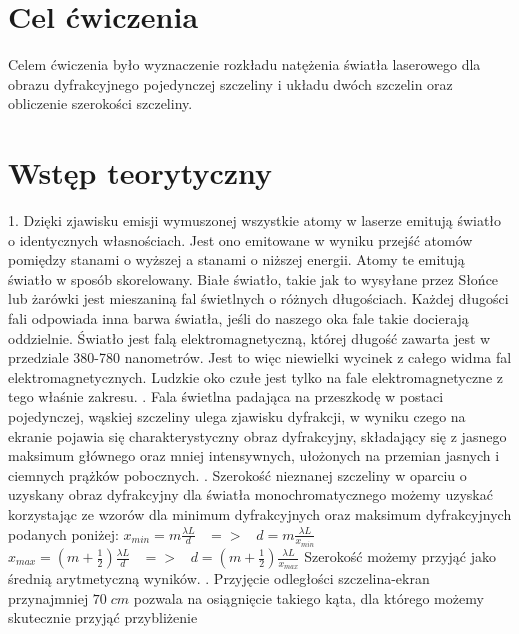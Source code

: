 \documentclass[12pt]{article}
\begin{document}
\tableofcontents \newpage
\section{Cel ćwiczenia}
Celem ćwiczenia było wyznaczenie rozkładu natężenia światła laserowego dla obrazu dyfrakcyjnego pojedynczej szczeliny i układu dwóch szczelin oraz obliczenie szerokości szczeliny.
\section{Wstęp teorytyczny}
1. Dzięki zjawisku emisji wymuszonej wszystkie atomy w laserze emitują światło o identycznych własnościach. Jest ono emitowane w wyniku przejść atomów pomiędzy stanami o wyższej a stanami o niższej energii. Atomy te emitują światło w sposób skorelowany. 
Białe światło, takie jak to wysyłane przez Słońce lub żarówki jest mieszaniną fal świetlnych o różnych długościach. Każdej długości fali odpowiada inna barwa światła, jeśli do naszego oka fale takie docierają oddzielnie. Światło jest falą elektromagnetyczną, której długość zawarta jest w przedziale 380-780 nanometrów. Jest to więc niewielki wycinek z całego widma fal elektromagnetycznych. Ludzkie oko czułe jest tylko na fale elektromagnetyczne z tego właśnie zakresu. . Fala świetlna padająca na przeszkodę w postaci pojedynczej, wąskiej szczeliny ulega zjawisku dyfrakcji, w wyniku czego na ekranie pojawia się charakterystyczny
obraz dyfrakcyjny, składający się z jasnego maksimum głównego oraz mniej intensywnych, ułożonych na przemian jasnych \newline i ciemnych prążków pobocznych. . Szerokość nieznanej szczeliny w oparciu o uzyskany obraz dyfrakcyjny dla światła monochromatycznego możemy uzyskać korzystając ze wzorów dla minimum dyfrakcyjnych oraz maksimum dyfrakcyjnych podanych poniżej: \newline
{\Large $x_{min}=m\frac{\lambda{L}}{d}\;\;\;=>\;\;\; d=m\frac{\lambda{L}}{x_{min}}$} \newline
{\Large $x_{max}=(m+\frac{1}{2})\frac{\lambda{L}}{d}\;\;\; =>\;\;\; d=(m+\frac{1}{2})\frac{\lambda{L}}{x_{max}}$} \newline
Szerokość możemy przyjąć jako średnią arytmetyczną wyników. . Przyjęcie odległości szczelina-ekran przynajmniej $70\;cm$ pozwala na osiągnięcie takiego kąta, dla którego możemy skutecznie przyjąć przybliżenie 
\end{document}
